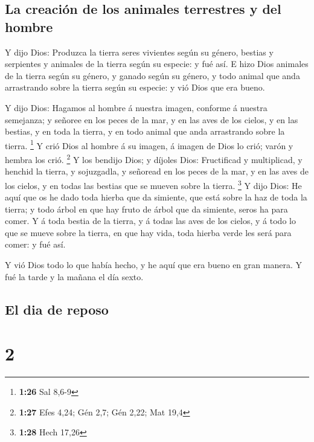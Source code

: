 \hypertarget{la-creaciuxf3n-de-los-animales-terrestres-y-del-hombre}{%
\subsection{La creación de los animales terrestres y del
hombre}\label{la-creaciuxf3n-de-los-animales-terrestres-y-del-hombre}}

 Y dijo Dios: Produzca la tierra seres vivientes según su
género, bestias y serpientes y animales de la tierra según su especie: y
fué así.  E hizo Dios animales de la tierra según su
género, y ganado según su género, y todo animal que anda arrastrando
sobre la tierra según su especie: y vió Dios que era bueno.

 Y dijo Dios: Hagamos al hombre á nuestra imagen,
conforme á nuestra semejanza; y señoree en los peces de la mar, y en las
aves de los cielos, y en las bestias, y en toda la tierra, y en todo
animal que anda arrastrando sobre la tierra. \footnote{\textbf{1:26} Sal
  8,6-9}  Y crió Dios al hombre á su imagen, á imagen de
Dios lo crió; varón y hembra los crió. \footnote{\textbf{1:27} Efes
  4,24; Gén 2,7; Gén 2,22; Mat 19,4}  Y los bendijo Dios;
y díjoles Dios: Fructificad y multiplicad, y henchid la tierra, y
sojuzgadla, y señoread en los peces de la mar, y en las aves de los
cielos, y en todas las bestias que se mueven sobre la tierra.
\footnote{\textbf{1:28} Hech 17,26}  Y dijo Dios: He aquí
que os he dado toda hierba que da simiente, que está sobre la haz de
toda la tierra; y todo árbol en que hay fruto de árbol que da simiente,
seros ha para comer.  Y á toda bestia de la tierra, y á
todas las aves de los cielos, y á todo lo que se mueve sobre la tierra,
en que hay vida, toda hierba verde les será para comer: y fué así.

 Y vió Dios todo lo que había hecho, y he aquí que era
bueno en gran manera. Y fué la tarde y la mañana el día sexto.

\hypertarget{el-dia-de-reposo}{%
\subsection{El dia de reposo}\label{el-dia-de-reposo}}

\hypertarget{section-1}{%
\section{2}\label{section-1}}

